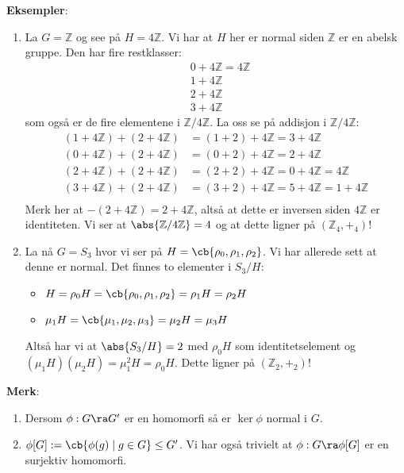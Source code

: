 \textbf{Eksempler}:
\begin{enumerate}
	\item La $G=\mathbb{Z}$ og see på $H=4 \mathbb{Z}$. Vi har at $H$ her er normal siden
	      $\mathbb{Z}$ er en abelsk gruppe. Den har fire restklasser:
	      \begin{align}
		       & 0+4 \mathbb{Z} = 4 \mathbb{Z} \\
		       & 1+4 \mathbb{Z}                \\
		       & 2+4 \mathbb{Z}                \\
		       & 3+4 \mathbb{Z}
	      \end{align}
	      som også er de fire elementene i $\mathbb{Z}/4 \mathbb{Z}$. La oss se på addisjon i
	      $\mathbb{Z}/4 \mathbb{Z}$:
	      \begin{align}
		      (1+4 \mathbb{Z}) + (2+4 \mathbb{Z}) & = (1+2)+4 \mathbb{Z} = 3+4 \mathbb{Z}                  \\
		      (0+4 \mathbb{Z}) + (2+4 \mathbb{Z}) & = (0+2)+4 \mathbb{Z} = 2+4 \mathbb{Z}                  \\
		      (2+4 \mathbb{Z}) + (2+4 \mathbb{Z}) & = (2+2)+4 \mathbb{Z} = 0+4 \mathbb{Z} = 4 \mathbb{Z}   \\
		      (3+4 \mathbb{Z}) + (2+4 \mathbb{Z}) & = (3+2)+4 \mathbb{Z} = 5+4 \mathbb{Z} = 1+4 \mathbb{Z} \\
	      \end{align}
	      Merk her at $-(2+4 \mathbb{Z}) = 2 + 4 \mathbb{Z}$, altså at dette er inversen siden
	      $4 \mathbb{Z}$ er identiteten. Vi ser at $\abs{\mathbb{Z}/4 \mathbb{Z}}=4$ og at dette
	      ligner på $(\mathbb{Z}_4,+_4)$!
	\item La nå $G=S_3$ hvor vi ser på $H=\cb{\rho_0, \rho_1, \rho_2}$. Vi har allerede sett
	      at denne er normal. Det finnes to elementer i $S_3/H$:
	      \begin{itemize}
		      \item $H=\rho_0 H=\cb{\rho_0, \rho_1, \rho_2}=\rho_1 H=\rho_2 H$
		      \item $\mu_1 H = \cb{\mu_1, \mu_2, \mu_3}=\mu_2 H=\mu_3 H$
	      \end{itemize}
	      Altså har vi at $\abs{S_3/H}=2$ med $\rho_0 H$ som identitetselement og
	      $(\mu_1 H)(\mu_2 H)= \mu_1^2 H = \rho_0 H$. Dette ligner på $(\mathbb{Z}_2, +_2)$!
\end{enumerate}

\textbf{Merk}:
\begin{enumerate}
	\item Dersom $\phi:G\ra G'$ er en homomorfi så er $\ker\phi$ normal i $G$.
	\item $\phi[G]:= \cb{\phi(g)\mid g\in G}\leq G'$. Vi har også trivielt at $\phi:G\ra \phi[G]$
	      er en surjektiv homomorfi.
\end{enumerate}

